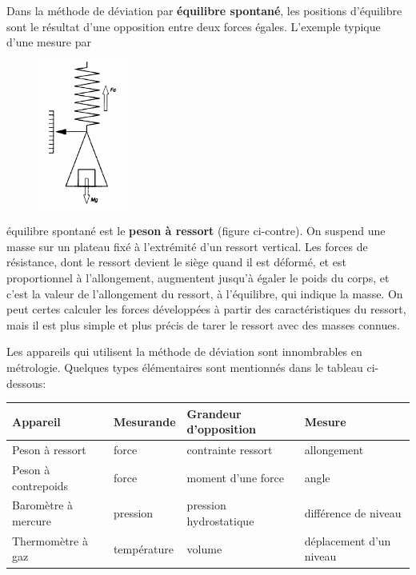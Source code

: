 Dans la méthode de déviation par \textbf{équilibre spontané}, les positions d'équilibre sont le résultat d'une opposition entre deux forces égales. L'exemple typique d'une mesure par \begin{figure}
   \centering
   \includegraphics[width=3cm]{assets/figures/mesdev.pdf}
\end{figure}
équilibre spontané est le \textbf{peson à ressort} (figure ci-contre). On suspend une masse sur un plateau fixé à l'extrémité d'un ressort vertical. Les forces de résistance, dont le ressort devient le siège quand il est déformé, et est proportionnel à l'allongement, augmentent jusqu'à égaler le poids du corps, et c'est la valeur de l'allongement du ressort, à l'équilibre, qui indique la masse. On peut certes calculer les forces développées à partir des caractéristiques du ressort, mais il est plus simple et plus précis de tarer le ressort avec des masses connues.

Les appareils qui utilisent la méthode de déviation sont innombrables en métrologie. Quelques types élémentaires sont mentionnés dans le tableau ci-dessous:
\begin{center}
\begin{tabular}{llll}
Appareil	 & Mesurande & Grandeur d'opposition & Mesure\\ \hline
Peson à ressort & force & contrainte ressort & allongement\\
Peson à contrepoids & force & moment d'une force & angle\\
Baromètre à mercure & pression & pression hydrostatique & différence de niveau\\
Thermomètre à gaz & température & volume & déplacement d'un niveau
\end{tabular}
\end{center}

